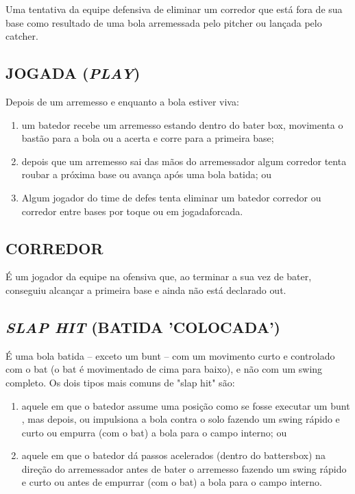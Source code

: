 Uma tentativa da equipe defensiva de eliminar um corredor que está fora de sua base como resultado de uma bola arremessada pelo \gls{pitcher} ou lançada pelo
\gls{catcher}.

\subsection{JOGADA (\textit{PLAY})}

 Depois de um arremesso e enquanto a bola estiver viva:

	\begin{enumerate}[label=(\alph*)]
		\item   um batedor recebe um arremesso estando dentro do bater box, movimenta o bastão para a bola ou a acerta e corre para a primeira base;
		\item  depois que um arremesso sai das mãos do arremessador algum corredor tenta  roubar a próxima base ou avança após uma bola batida; ou
		\item  Algum jogador do time de defes tenta eliminar um batedor corredor ou corredor entre bases por toque ou em \gls{jogadaforcada}.
	\end{enumerate}

\subsection{CORREDOR}
 É um jogador da equipe na ofensiva que, ao terminar a sua vez de bater, conseguiu alcançar a primeira base e ainda não está declarado \gls{out}.

\subsection{\textit{SLAP HIT} (BATIDA 'COLOCADA')}

 É uma bola batida -- exceto um \gls{bunt}  -- com um movimento curto e controlado com o \gls{bat} (o \gls{bat} é movimentado de cima para baixo), e não com um \gls{swing} completo. Os dois tipos mais comuns de "slap hit" são:

\begin{enumerate}[label=(\alph*)]\item   aquele em que o batedor assume uma posição como se fosse executar um \gls{bunt} , mas depois, ou impulsiona a bola contra o solo fazendo um \gls{swing} rápido e curto ou empurra (com o \gls{bat}) a bola para o campo interno; ou
\item  aquele em que o batedor dá passos acelerados (dentro do \gls{battersbox}) na  direção do arremessador antes de bater o arremesso fazendo um \gls{swing} rápido e curto ou antes de empurrar (com o \gls{bat}) a bola para o campo interno.
\end{enumerate}

